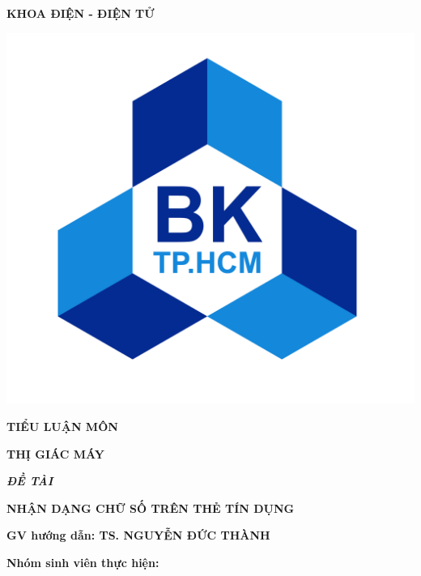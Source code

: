 \begin{titlepage}
\begin{center}
        \vspace{7pt}
        \textbf{KHOA ĐIỆN - ĐIỆN TỬ}
    \end{center}
    \vspace{10pt}
    \begin{center}
        \includegraphics[scale=0.3]{images/Logo-BK.png}
        
        \vspace{10pt}
        \fontsize{18pt}{17pt}\selectfont 
        \textbf{TIỂU LUẬN MÔN} 
        
        \vspace{7pt}
        \textbf{THỊ GIÁC MÁY}
    \end{center}
    \begin{flushleft}
        \fontsize{14pt}{17pt}\selectfont  
        \hspace{1.5cm}\textbf{\textsl{ĐỀ TÀI}}
    \end{flushleft}
    \begin{center}
        \fontsize{15pt}{17pt}\selectfont 
        \textbf{\textrm{NHẬN DẠNG CHỮ SỐ TRÊN THẺ TÍN DỤNG}}
    \end{center}
    
    \vspace{15pt}
    \hspace{1cm}
    \textbf{GV hướng dẫn: TS. NGUYỄN ĐỨC THÀNH}
    
    \vspace{10pt}
    \hspace{1cm}
    \textbf{Nhóm sinh viên thực hiện:}
    

\end{titlepage}
